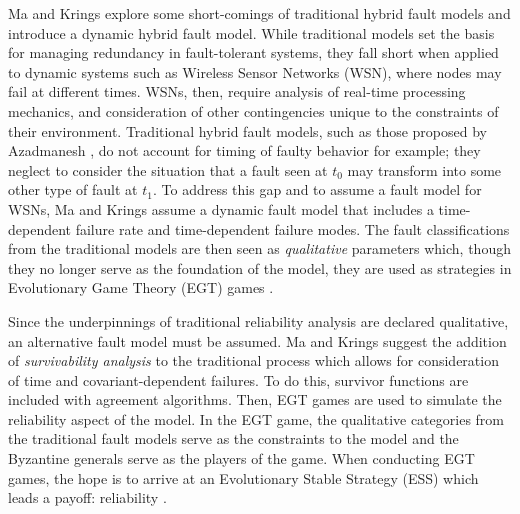 \documentclass[twoside, conference]{IEEEtran}%
\begin{document}
Ma and Krings \cite{Ma2008} explore some short-comings of traditional hybrid fault models and introduce a dynamic hybrid fault model. While traditional models set the basis for managing redundancy in fault-tolerant systems, they fall short when applied to dynamic systems such as Wireless Sensor Networks (WSN), where nodes may fail at different times. WSNs, then, require analysis of real-time processing mechanics, and consideration of other contingencies unique to the constraints of their environment. Traditional hybrid fault models, such as those proposed by Azadmanesh \cite{Azadmanesh2000}, do not account for timing of faulty behavior for example; they neglect to consider the situation that a fault seen at $t_0$ may transform into some other type of fault at $t_1$. To address this gap and to assume a fault model for WSNs, Ma and Krings assume a dynamic fault model that includes a time-dependent failure rate and time-dependent failure modes. The fault classifications from the traditional models are then seen as \textit{qualitative} parameters which, though they no longer serve as the foundation of the model, they are used as strategies in Evolutionary Game Theory (EGT) games \cite{Ma2008}.

Since the underpinnings of traditional reliability analysis are declared qualitative, an alternative fault model must be assumed. Ma and Krings suggest the addition of \textit{survivability analysis} to the traditional process which allows for consideration of time and covariant-dependent failures. To do this, survivor functions are included with agreement algorithms. Then, EGT games are used to simulate the reliability aspect of the model. In the EGT game, the qualitative categories from the traditional fault models serve as the constraints to the model and the Byzantine generals serve as the players of the game. When conducting EGT games, the hope is to arrive at an Evolutionary Stable Strategy (ESS) which leads a payoff: reliability \cite{Ma2008}.
\end{document}
